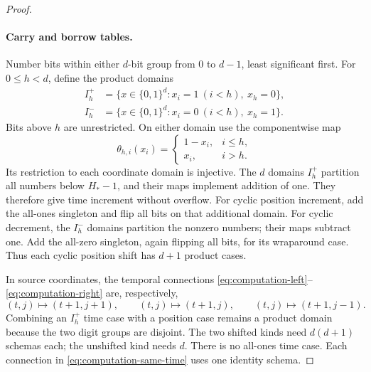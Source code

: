 \begin{proof}
\paragraph{Carry and borrow tables.}
Number bits within either $d$-bit group from $0$ to $d-1$, least
significant first. For $0\le h<d$, define the product domains
\begin{align*}
 I_h^+&=\{x\in\{0,1\}^d:x_i=1\ (i<h),\ x_h=0\},\\
 I_h^-&=\{x\in\{0,1\}^d:x_i=0\ (i<h),\ x_h=1\}.
\end{align*}
Bits above $h$ are unrestricted. On either domain use the componentwise
map
\begin{equation}\label{eq:computation-bit-flip}
 \theta_{h,i}(x_i)=
 \begin{cases}
  1-x_i,&i\le h,\\
  x_i,&i>h.
 \end{cases}
\end{equation}
Its restriction to each coordinate domain is injective. The $d$ domains
$I_h^+$ partition all numbers below $H_*-1$, and their maps implement
addition of one. They therefore give time increment without overflow.
For cyclic position increment, add the all-ones singleton and flip all
bits on that additional domain. For cyclic decrement, the $I_h^-$
domains partition the nonzero numbers; their maps subtract one. Add the
all-zero singleton, again flipping all bits, for its wraparound case.
Thus each cyclic position shift has $d+1$ product cases.

In source coordinates, the temporal connections
\eqref{eq:computation-left}--\eqref{eq:computation-right} are, respectively,
\begin{equation}\label{eq:computation-source-maps}
 (t,j)\mapsto(t+1,j+1),\qquad
 (t,j)\mapsto(t+1,j),\qquad
 (t,j)\mapsto(t+1,j-1).
\end{equation}
Combining an $I_h^+$ time case with a position case remains a product
domain because the two digit groups are disjoint. The two shifted kinds
need $d(d+1)$ schemas each; the unshifted kind needs $d$. There is no
all-ones time case. Each connection in
\eqref{eq:computation-same-time} uses one identity schema.


\end{proof}
